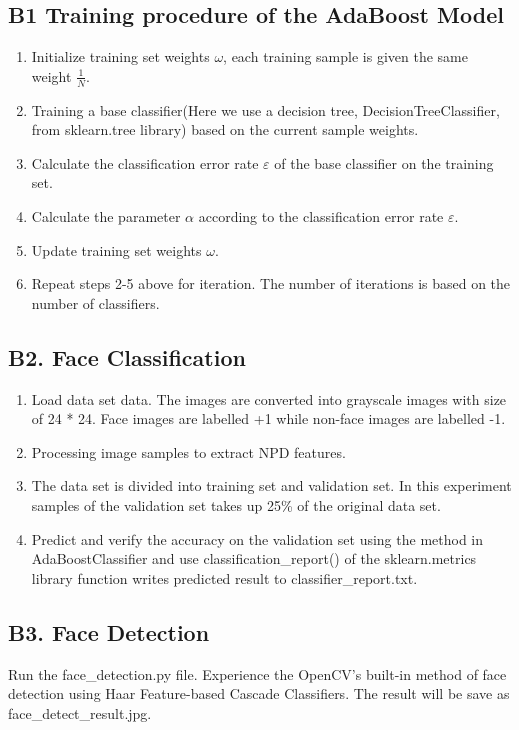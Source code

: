 \documentclass[journal, a4paper]{IEEEtran}
\begin{document}
\subsection*{B1 Training procedure of the AdaBoost Model}
    \begin{enumerate}
\item Initialize training set weights $\omega$, each training sample is given the same weight $\frac{1}{N}$. 
\item Training a base classifier(Here we use a decision tree, DecisionTreeClassifier, from sklearn.tree library) based on the current sample weights. 
\item Calculate the classification error rate $\varepsilon$ of the base classifier on the training set. 
\item Calculate the parameter $\alpha$ according to the classification error rate $\varepsilon$. 
\item Update training set weights $\omega$. 
\item Repeat steps 2-5 above for iteration. The number of iterations is based on the number of classifiers. 
    \end{enumerate}

\subsection*{B2. Face Classification}
      \begin{enumerate}
\item Load data set data. The images are converted into grayscale images with size of 24 * 24. Face images are labelled +1 while non-face images are labelled -1.
\item Processing image samples to extract NPD features.
\item The data set is divided into training set and validation set. In this experiment samples of the validation set takes up 25\% of the original data set. 
\item Predict and verify the accuracy on the validation set using the method in AdaBoostClassifier and use classification\_report() of the sklearn.metrics library function writes predicted result to classifier\_report.txt. \label{step:face_clf_4}
      \end{enumerate}

      \subsection*{B3. Face Detection}
Run the face\_detection.py file. Experience the OpenCV's built-in method of face detection using Haar Feature-based Cascade Classifiers. The result will be save as face\_detect\_result.jpg.
\end{document}
